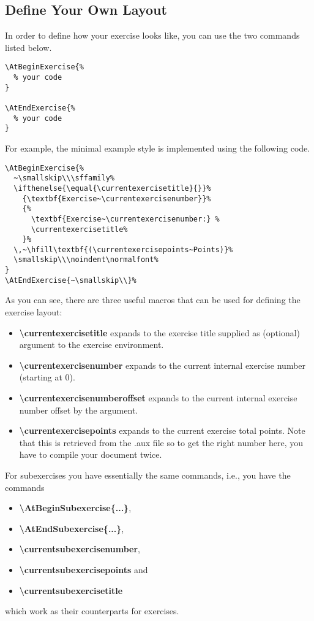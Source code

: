 \documentclass[
  twocolumn,%
  fontsize=9pt,%
  DIV=calc,%
  numbers=noendperiod%
]{scrartcl}
\begin{document}
\subsection{Define Your Own Layout}
In order to define how your exercise looks like, you can use the two commands listed below.
\begin{lstlisting}
\AtBeginExercise{%
  % your code
}

\AtEndExercise{%
  % your code
}
\end{lstlisting}
For example, the minimal example style is implemented using the following code.
\begin{lstlisting}
\AtBeginExercise{%
  ~\smallskip\\\sffamily%
  \ifthenelse{\equal{\currentexercisetitle}{}}%
    {\textbf{Exercise~\currentexercisenumber}}%
    {%
      \textbf{Exercise~\currentexercisenumber:} %
      \currentexercisetitle%
    }%
  \,~\hfill\textbf{(\currentexercisepoints~Points)}%
  \smallskip\\\noindent\normalfont%
}
\AtEndExercise{~\smallskip\\}%
\end{lstlisting}
As you can see, there are three useful macros that can be used for defining the exercise layout:
\begin{itemize}
  \item \textcolor{NavyBlue}{\ttfamily\bfseries\textbackslash currentexercisetitle} expands to the exercise title supplied as (optional) argument to the exercise environment.
  \item \textcolor{NavyBlue}{\ttfamily\bfseries\textbackslash currentexercisenumber} expands to the current internal exercise number (starting at $0$). 
  \item \textcolor{NavyBlue}{\ttfamily\bfseries\textbackslash currentexercisenumberoffset} expands to the current internal exercise number offset by the argument. 
  \item \textcolor{NavyBlue}{\ttfamily\bfseries\textbackslash currentexercisepoints} expands to the current exercise total points. Note that this is retrieved from the .aux file so to get the right number here, you have to compile your document twice.
\end{itemize}

\noindent For subexercises you have essentially the same commands, i.e., you have the commands 
\begin{itemize}
\item \textcolor{NavyBlue}{\ttfamily\bfseries\textbackslash AtBeginSubexercise\{...\}},
\item \textcolor{NavyBlue}{\ttfamily\bfseries\textbackslash AtEndSubexercise\{...\}}, 
\item \textcolor{NavyBlue}{\ttfamily\bfseries\textbackslash currentsubexercisenumber}, 
\item \textcolor{NavyBlue}{\ttfamily\bfseries\textbackslash currentsubexercisepoints} and 
\item \textcolor{NavyBlue}{\ttfamily\bfseries\textbackslash currentsubexercisetitle}
\end{itemize}
which work as their counterparts for exercises.
\end{document}
